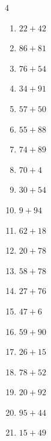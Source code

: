 \begin{multicols}{4}
\begin{enumerate}
  \item $22+42$
        \phantom{$=64$}

  \item $86+81$
        \phantom{$=167$}

  \item $76+54$
        \phantom{$=130$}

  \item $34+91$
        \phantom{$=125$}

  \item $57+50$
        \phantom{$=107$}

  \item $55+88$
        \phantom{$=143$}

  \item $74+89$
        \phantom{$=163$}

  \item $70+4$
        \phantom{$=74$}

  \item $30+54$
        \phantom{$=84$}

  \item $9+94$
        \phantom{$=103$}

  \item $62+18$
        \phantom{$=80$}

  \item $20+78$
        \phantom{$=98$}

  \item $58+78$
        \phantom{$=136$}

  \item $27+76$
        \phantom{$=103$}

\columnbreak %

  \item $47+6$
        \phantom{$=53$}

  \item $59+90$
        \phantom{$=149$}

  \item $26+15$
        \phantom{$=41$}

  \item $78+52$
        \phantom{$=130$}

  \item $20+92$
        \phantom{$=112$}

  \item $95+44$
        \phantom{$=139$}

  \item $15+49$
        \phantom{$=64$}


\end{enumerate}
\end{multicols}
